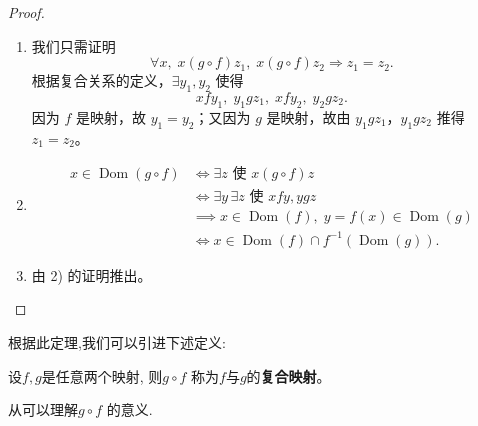 \begin{proof}
	\begin{enumerate}[label=\arabic*)]
		\item 我们只需证明
		\[
		\forall x,\; x(g \circ f)z_1,\; x(g \circ f)z_2 \Longrightarrow z_1 = z_2.
		\]
		根据复合关系的定义，$\exists y_1, y_2$ 使得
		\[
		xfy_1,\; y_1gz_1,\; xfy_2,\; y_2gz_2.
		\]
		因为 $f$ 是映射，故 $y_1 = y_2$；又因为 $g$ 是映射，故由 $y_1gz_1$，$y_1gz_2$ 推得 $z_1 = z_2$。
		
		\item 
		\begin{align*}
			x \in \operatorname{Dom}(g \circ f) 
			&\iff \exists z \text{ 使 } x(g \circ f)z \\
			&\iff \exists y\, \exists z \text{ 使 } xfy, ygz \\
			&\implies x \in \operatorname{Dom}(f),\; y = f(x) \in \operatorname{Dom}(g) \\
			&\iff x \in \operatorname{Dom}(f) \cap f^{-1}(\operatorname{Dom}(g)).
		\end{align*}
		
		\item 由 2) 的证明推出。
	\end{enumerate}
\end{proof}

根据此定理,我们可以引进下述定义:

\begin{mydef*}{}

设$f,g$是任意两个映射, 则\(g \circ f\) 称为$f$与$g$的\textbf{复合映射}。

\end{mydef*}

从可以理解\(g \circ f\) 的意义.

